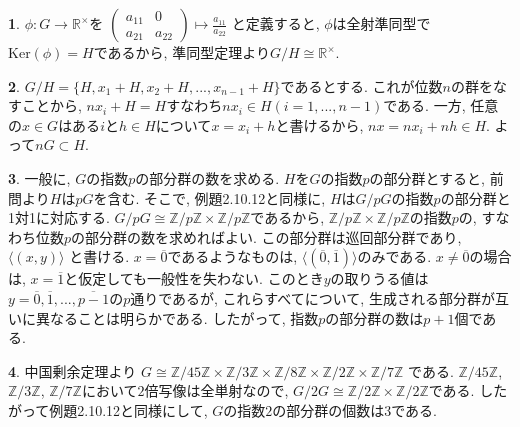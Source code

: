 \documentclass{amsart}
\theoremstyle{definition}
\newtheorem{ans}{}
\numberwithin{ans}{subsection}
\newcommand{\Z}[1]{\mathbb{Z}/#1\mathbb{Z}}
\newcommand{\Ker}[1]{\mathrm{Ker}(#1)}
\begin{document}
\begin{ans}
  $\phi: G \rightarrow \mathbb{R}^\times$を
  $\begin{pmatrix}
    a_{11} & 0 \\
    a_{21} & a_{22}
  \end{pmatrix} \mapsto \frac{a_{11}}{a_{22}}$
  と定義すると, $\phi$は全射準同型で$\Ker{\phi} = H$であるから,
  準同型定理より$G/H \cong \mathbb{R}^\times$.
\end{ans}

\begin{ans}
  $G/H = \{H, x_1 + H, x_2 + H,..., x_{n-1} + H\}$であるとする.
  これが位数$n$の群をなすことから, $nx_i + H = H$すなわち$nx_i \in H (i = 1,..., n-1)$である.
  一方, 任意の$x \in G$はある$i$と$h \in H$について$x = x_i + h$と書けるから,
  $nx = nx_i + nh \in H$. よって$nG \subset H$.
\end{ans}

\begin{ans}
  一般に, $G$の指数$p$の部分群の数を求める.
  $H$を$G$の指数$p$の部分群とすると, 前問より$H$は$pG$を含む.
  そこで, 例題2.10.12と同様に, $H$は$G/pG$の指数$p$の部分群と1対1に対応する.
  $G/pG \cong \Z{p} \times \Z{p}$であるから,
  $\Z{p} \times \Z{p}$の指数$p$の, すなわち位数$p$の部分群の数を求めればよい.
  この部分群は巡回部分群であり, $\langle(x, y)\rangle$ と書ける.
  $x = \overline{0}$であるようなものは, $\langle(\overline{0}, \overline{1})\rangle$のみである.
  $x \neq \overline{0}$の場合は, $x = \overline{1}$と仮定しても一般性を失わない.
  このとき$y$の取りうる値は$y = \overline{0}, \overline{1},..., \overline{p-1}$の$p$通りであるが,
  これらすべてについて, 生成される部分群が互いに異なることは明らかである.
  したがって, 指数$p$の部分群の数は$p + 1$個である.
\end{ans}

\begin{ans}
  中国剰余定理より
  $G \cong \Z{45} \times \Z{3} \times \Z{8} \times \Z{2} \times \Z{7}$
  である. $\Z{45}$, $\Z{3}$, $\Z{7}$において$2$倍写像は全単射なので,
  $G/2G \cong \Z{2} \times \Z{2}$である.
  したがって例題2.10.12と同様にして, $G$の指数$2$の部分群の個数は$3$である.
\end{ans}
\end{document}
